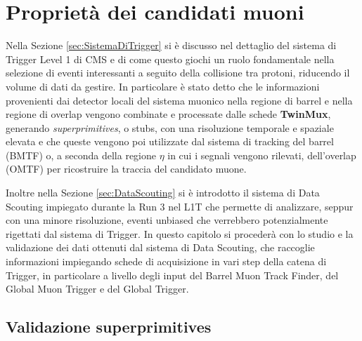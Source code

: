 \chapter{Proprietà dei candidati muoni}
\label{cap:SecondoCapitolo}
\let\cleardoublepage\clearpage

Nella Sezione \ref{sec:SistemaDiTrigger} si è discusso nel dettaglio del sistema di Trigger Level 1 di CMS e di come questo giochi un ruolo fondamentale nella selezione di eventi interessanti a seguito della collisione tra protoni, riducendo il volume di dati da gestire. In particolare è stato detto che le informazioni provenienti dai detector locali del sistema muonico nella regione di barrel e nella regione di overlap vengono combinate e processate dalle schede \textbf{TwinMux}, generando \textit{superprimitives}, o stubs, con una risoluzione temporale e spaziale elevata e che queste vengono poi utilizzate dal sistema di tracking del barrel (BMTF) o, a seconda della regione $\eta$ in cui i segnali vengono rilevati, dell'overlap (OMTF) per ricostruire la traccia del candidato muone.

Inoltre nella Sezione \ref{sec:DataScouting} si è introdotto il sistema di Data Scouting impiegato durante la Run 3 nel L1T che permette di analizzare, seppur con una minore risoluzione, eventi unbiased che verrebbero potenzialmente rigettati dal sistema di Trigger. In questo capitolo si procederà con lo studio e la validazione dei dati ottenuti dal sistema di Data Scouting, che raccoglie informazioni impiegando schede di acquisizione in vari step della catena di Trigger, in particolare a livello degli input del Barrel Muon Track Finder, del Global Muon Trigger e del Global Trigger.


\section{Validazione superprimitives}
\label{sec:Superprimitives}

